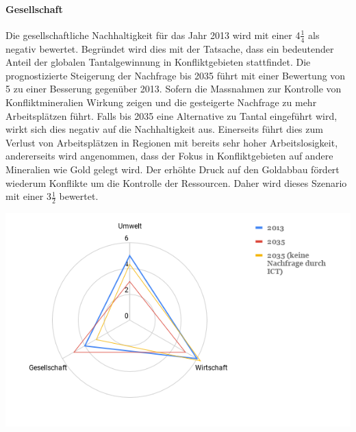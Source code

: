 \paragraph{Gesellschaft}
Die gesellschaftliche Nachhaltigkeit für das Jahr 2013 wird mit einer 4\(\frac{1}{4}\) 
als negativ bewertet. Begründet wird dies mit der Tatsache, dass ein bedeutender Anteil 
der globalen Tantalgewinnung in Konfliktgebieten stattfindet. Die prognostizierte 
Steigerung der Nachfrage bis 2035 führt mit einer Bewertung von 5 zu einer 
Besserung gegenüber 2013. Sofern die Massnahmen zur Kontrolle von Konfliktmineralien 
Wirkung zeigen und die gesteigerte Nachfrage zu mehr Arbeitsplätzen führt. Falls bis
2035 eine Alternative zu Tantal eingeführt wird, wirkt sich dies negativ auf die 
Nachhaltigkeit aus. Einerseits führt dies zum Verlust von Arbeitsplätzen in Regionen
mit bereits sehr hoher Arbeitslosigkeit, andererseits wird angenommen, dass der 
Fokus in Konfliktgebieten auf andere Mineralien wie Gold gelegt wird. Der erhöhte Druck
auf den Goldabbau fördert wiederum Konflikte um die Kontrolle der Ressourcen. Daher 
wird dieses Szenario mit einer 3\(\frac{1}{2}\) bewertet.


\begin{center}
\includegraphics[width=14cm]{images/tantal-results}
\end{center}
